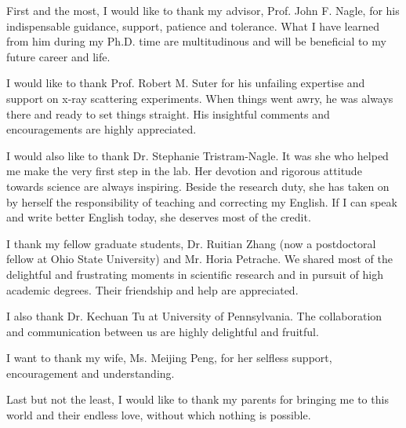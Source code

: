 
First and the most, I would like to thank my advisor, 
Prof. John F. Nagle, for his indispensable guidance, support, 
patience and tolerance. What I have learned from him during my Ph.D. 
time are multitudinous and will be beneficial to my future career 
and life.

I would like to thank Prof. Robert M. Suter for his unfailing
expertise and support on x-ray scattering experiments. When things
went awry, he was always there and ready to set things straight. 
His insightful comments and encouragements are highly appreciated.

I would also like to thank Dr. Stephanie Tristram-Nagle. It was she
who helped me make the very first step in the lab. Her devotion
and rigorous attitude towards science are always inspiring.
Beside the research duty, she has taken on by herself the responsibility 
of teaching and correcting my English. If I can speak and write better
English today, she deserves most of the credit.

I thank my fellow graduate students, Dr. Ruitian Zhang (now a postdoctoral
fellow at Ohio State University) and Mr. Horia Petrache. 
We shared most of the delightful and frustrating moments in
scientific research and in pursuit of high academic degrees.
Their friendship and help are appreciated. 

I also thank Dr. Kechuan Tu at University of Pennsylvania. The collaboration
and communication between us are highly delightful and fruitful.

I want to thank my wife, Ms. Meijing Peng, for her selfless support, 
encouragement and understanding.
 
Last but not the least, I would like to thank my parents for bringing me
to this world and their endless love, without which nothing is possible.
